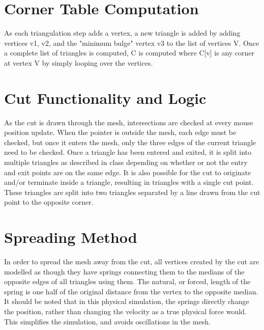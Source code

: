 \documentclass[letterpaper,10pt]{IEEEtran}
\begin{document}
\section{Corner Table Computation}
As each triangulation step adds a vertex, a new triangle is added by adding vertices v1, v2, and the "minimum bulge" vertex v3 to the list of vertices V.  Once a complete list of triangles is computed, C is computed where C[v] is any corner at vertex V by simply looping over the vertices.

\section{Cut Functionality and Logic}
As the cut is drawn through the mesh, intersections are checked at every mouse position update.
When the pointer is outside the mesh, each edge must be checked, but once it enters the mesh, only the three edges of the current triangle need to be checked.
Once a triangle has been entered and exited, it is split into multiple triangles as described in class depending on whether or not the entry and exit points are on the same edge.
It is also possible for the cut to originate and/or terminate inside a triangle, resulting in triangles with a single cut point.
These triangles are split into two triangles separated by a line drawn from the cut point to the opposite corner.

\section{Spreading Method}
In order to spread the mesh away from the cut, all vertices created by the cut are modelled as though they have springs connecting them to the medians of the opposite edges of all triangles using them.
The natural, or forced, length of the spring is one half of the original distance from the vertex to the opposite median.
It should be noted that in this physical simulation, the springs directly change the position, rather than changing the velocity as a true physical force would.
This simplifies the simulation, and avoids oscillations in the mesh.
\end{document}
